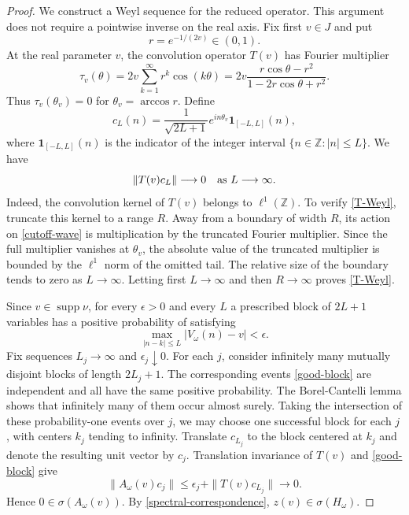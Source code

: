 \documentclass[12pt,a4paper]{article}
\numberwithin{equation}{section}
\newcommand{\supp}{\operatorname{supp}}
\newcommand{\Z}{\mathbb Z}
\begin{document}
\begin{proof}
We construct a Weyl sequence for the reduced operator.  This argument does
not require a pointwise inverse on the real axis.  Fix first
$v\in J$ and put
$$
r=e^{-1/(2v)}\in(0,1).
$$
At the real parameter $v$, the convolution operator $T(v)$ has Fourier
multiplier
\begin{equation}
\tau_v(\theta)
 =2v\sum_{k=1}^{\infty}r^k\cos(k\theta)
 =2v\frac{r\cos\theta-r^2}
 {1-2r\cos\theta+r^2}.
\label{T-symbol}
\end{equation}
Thus $\tau_v(\theta_v)=0$ for
$\theta_v=\arccos r$.  Define
\begin{equation}
 c_L(n)=\frac{1}{\sqrt{2L+1}}e^{in\theta_v}
 \boldsymbol 1_{[-L,L]}(n),
\label{cutoff-wave}
\end{equation}
where $\boldsymbol 1_{[-L,L]}(n)$ is the indicator of the integer interval
$\{n\in\Z:|n|\le L\}$.  We have
\begin{equation}
 \|T(v)c_L\|\longrightarrow0
 \quad\hbox{as }L\longrightarrow\infty.
\label{T-Weyl}
\end{equation}
Indeed, the convolution kernel of $T(v)$ belongs to $\ell^1(\Z)$.
To verify \eqref{T-Weyl}, truncate this kernel to a range $R$.  Away from a
boundary of width $R$, its action on \eqref{cutoff-wave} is multiplication by
the truncated Fourier multiplier.  Since the full multiplier vanishes at
$\theta_v$, the absolute value of the truncated multiplier is bounded by the
$\ell^1$ norm of the omitted tail.  The relative size of the boundary tends
to zero as $L\to\infty$.  Letting first $L\to\infty$ and then $R\to\infty$
proves \eqref{T-Weyl}.

Since $v\in\supp\nu$, for every $\epsilon>0$ and every $L$ a prescribed
block of $2L+1$ variables has a positive probability of satisfying
\begin{equation}
 \max_{|n-k|\le L}|V_\omega(n)-v|<\epsilon.
\label{good-block}
\end{equation}
Fix sequences $L_j\to\infty$ and $\epsilon_j\downarrow0$.  For each $j$,
consider infinitely many mutually disjoint blocks of length $2L_j+1$.
The corresponding events \eqref{good-block} are independent and all have the
same positive probability.  The Borel-Cantelli lemma shows that infinitely
many of them occur almost surely.  Taking the intersection of these
probability-one events over $j$, we may choose one successful block for each
$j$, with centers $k_j$ tending to infinity.  Translate
$c_{L_j}$ to the block centered at $k_j$ and denote the resulting unit vector
by $c_j$.  Translation invariance of $T(v)$ and \eqref{good-block} give
\begin{equation}
 \|A_\omega(v)c_j\|
 \le \epsilon_j+\|T(v)c_{L_j}\|\longrightarrow0.
\label{A-Weyl}
\end{equation}
Hence $0\in\sigma(A_\omega(v))$.  By
\eqref{spectral-correspondence}, $z(v)\in\sigma(H_\omega)$.


\end{proof}
\end{document}
